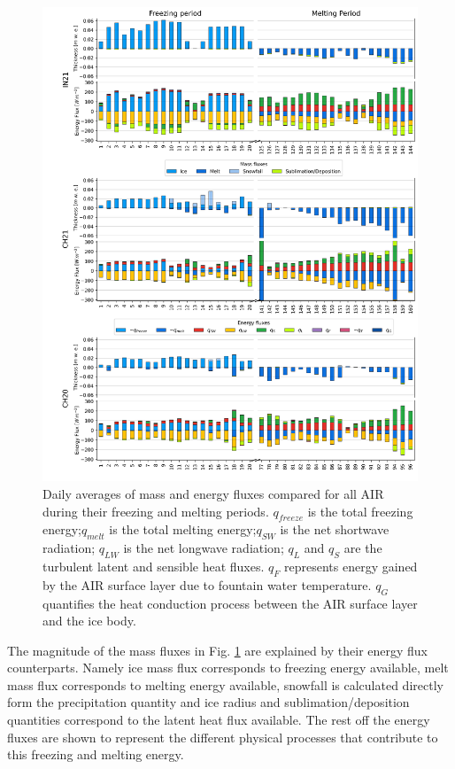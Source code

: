 \documentclass[utf8]{frontiersSCNS} %
\begin{document}
\begin{figure}
	\begin{center}
		\includegraphics[width=\linewidth]{Figures/mass_energy_bal.jpg} \end{center}
	\caption{Daily averages of mass and energy fluxes compared for all AIR during their freezing and melting periods.
		$q_{freeze}$ is the total freezing energy;$q_{melt}$ is the total melting energy;$q_{SW}$ is the net shortwave
		radiation; $q_{LW}$ is the net longwave radiation; $q_{L}$ and $q_{S}$ are the turbulent latent and sensible heat
		fluxes. $q_{F}$ represents energy gained by the AIR surface layer due to fountain water temperature.  $q_{G}$
		quantifies the heat conduction process between the AIR surface layer and the ice body. } \label{fig:MEB}
\end{figure}

The magnitude of the mass fluxes in Fig. \ref{fig:MEB} are explained by their energy flux counterparts. Namely ice mass
flux corresponds to freezing energy available, melt mass flux corresponds to melting energy available, snowfall is
calculated directly form the precipitation quantity and ice radius and sublimation/deposition quantities correspond to
the latent heat flux available. The rest off the energy fluxes are shown to represent the different physical processes
that contribute to this freezing and melting energy.
\end{document}
